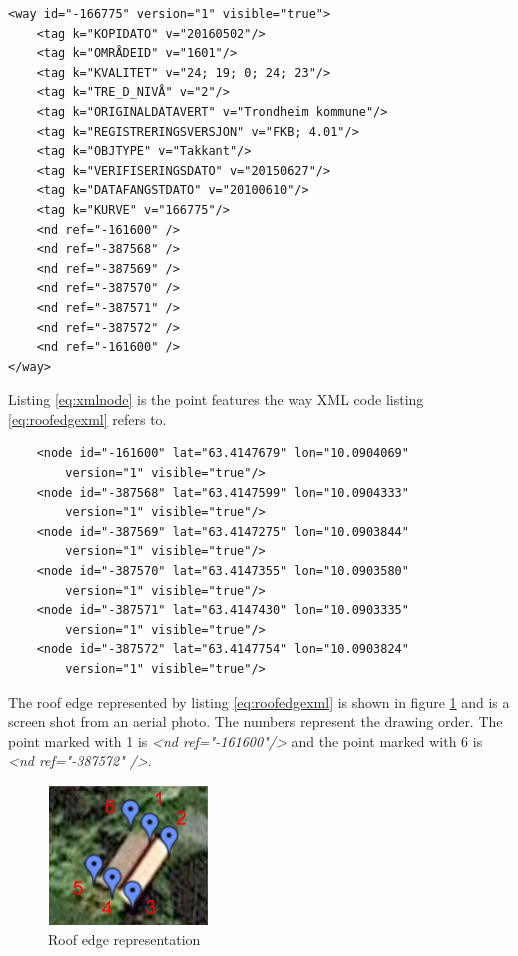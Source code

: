 \begin{lstlisting}
<way id="-166775" version="1" visible="true">
	<tag k="KOPIDATO" v="20160502"/>
	<tag k="OMRÅDEID" v="1601"/>
	<tag k="KVALITET" v="24; 19; 0; 24; 23"/>
	<tag k="TRE_D_NIVÅ" v="2"/>
	<tag k="ORIGINALDATAVERT" v="Trondheim kommune"/>
	<tag k="REGISTRERINGSVERSJON" v="FKB; 4.01"/>
	<tag k="OBJTYPE" v="Takkant"/>
	<tag k="VERIFISERINGSDATO" v="20150627"/>
	<tag k="DATAFANGSTDATO" v="20100610"/>
	<tag k="KURVE" v="166775"/>
	<nd ref="-161600" />
	<nd ref="-387568" />
	<nd ref="-387569" />
	<nd ref="-387570" />
	<nd ref="-387571" />
	<nd ref="-387572" />
	<nd ref="-161600" />
</way>
\end{lstlisting}

Listing \ref{eq:xmlnode} is the point features the way XML code listing \ref{eq:roofedgexml} refers to. 

\begin{lstlisting}
	<node id="-161600" lat="63.4147679" lon="10.0904069" 
		version="1" visible="true"/>
	<node id="-387568" lat="63.4147599" lon="10.0904333" 
		version="1" visible="true"/>
	<node id="-387569" lat="63.4147275" lon="10.0903844" 
		version="1" visible="true"/>
	<node id="-387570" lat="63.4147355" lon="10.0903580" 
		version="1" visible="true"/>
	<node id="-387571" lat="63.4147430" lon="10.0903335" 
		version="1" visible="true"/>
	<node id="-387572" lat="63.4147754" lon="10.0903824" 
		version="1" visible="true"/>
\end{lstlisting}

The roof edge represented by listing \ref{eq:roofedgexml} is shown in figure \ref{fig:roofedgeeks} and is a screen shot from an aerial photo. The numbers represent the drawing order. The point marked with 1 is \textit{<nd ref="-161600"/>} and the point marked with 6 is \textit{<nd ref="-387572" />}. 

\begin{figure}[H]
    \centering
    \includegraphics[scale=0.9]{figures/FixedByMe/sosiArea.png}
    \caption{Roof edge representation}
    \label{fig:roofedgeeks}
\end{figure} 


